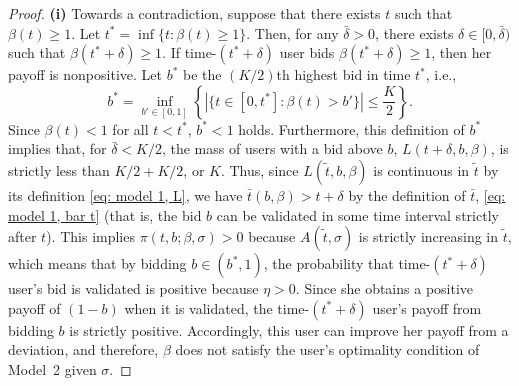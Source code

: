 \documentclass[12pt, letterpaper]{article}
\begin{document}
\begin{proof} %
\textbf{(i)} Towards a contradiction, suppose that there exists $t$ such that $\beta(t) \ge 1$. Let $t^* = \inf\{t: \beta(t) \ge 1\}$. Then, for any $\bar{\delta} > 0$, there exists $\delta \in [0, \bar{\delta})$ such that $\beta(t^* + \delta) \ge 1$. If time-$(t^* + \delta)$ user bids $\beta(t^* + \delta) \ge 1$, then her payoff is nonpositive. Let $b^*$ be the $(K/2)$th highest bid in time $t^*$, i.e.,
\begin{equation}
    b^* = \inf_{b' \in [0, 1]} \left\{|\{t \in [0, t^*]: \beta(t) > b'\}| \le \frac{K}{2}\right\}.
\end{equation}
Since $\beta(t) < 1$ for all $t < t^*$, $b^* < 1$ holds. Furthermore, this definition of $b^*$ implies that, for $\bar{\delta} < K/2$,
the mass of users with a bid above $b$, $L(t+\delta,b,\beta)$, is strictly less than $K/2+K/2$, or $K$. Thus, since  $L(\tilde{t},b,\beta)$ is continuous in $\tilde{t}$ by its definition \eqref{eq: model 1, L}, we have $\bar{t}(b,\beta)>t+\delta$ by the definition of $\bar{t}$,  \eqref{eq: model 1, bar t} (that is, the bid $b$ can be validated in some time interval strictly after $t$). This implies $\pi(t,b;\beta,\sigma)>0$ because $A(\tilde{t},\sigma)$ is strictly increasing in $\tilde{t}$, which means that by bidding $b \in (b^*, 1)$, the probability that time-$(t^* + \delta)$ user's bid is validated is positive because $\eta>0$. Since she obtains a positive payoff of $(1 - b)$ when it is validated, the time-$(t^* + \delta)$ user's payoff from bidding $b$ is strictly positive. Accordingly, this user can improve her payoff from a deviation, and therefore, $\beta$
does not satisfy the user's optimality condition of Model~2 given  $\sigma$.


\end{proof}
\end{document}
